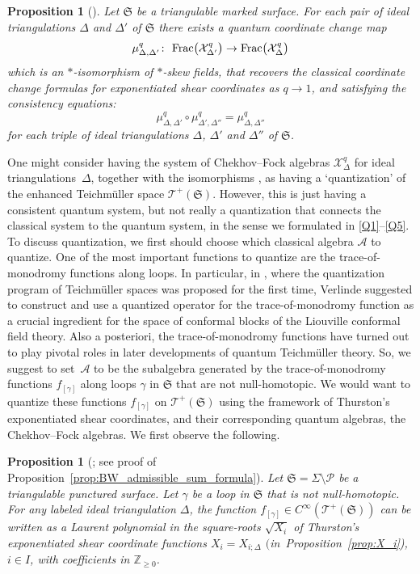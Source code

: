 \documentclass[10pt,a4paper]{amsart}
\numberwithin{equation}{section}
\newtheorem{Proposition}[Theorem]{Proposition}
\theoremstyle{definition}
\begin{document}
\begin{Proposition}[\cite{BL07, CF, FG09, Kash98, Liu}]
\label{prop:mu_q_Delta_Delta_prime}
Let $\mathfrak{S}$ be a triangulable marked surface.
For each pair of ideal triangulations $\Delta$ and $\Delta'$ of $\mathfrak{S}$ there exists a quantum coordinate change map
\[
\mu^q_{\Delta,\Delta'} \colon \ {\rm Frac}\bigl(\mathcal{X}^q_{\Delta'}\bigr) \to {\rm Frac}\bigl(\mathcal{X}^q_\Delta\bigr)
\]
which is an $*$-isomorphism of $*$-skew fields, that recovers the classical coordinate change formulas for exponentiated shear coordinates as $q\to 1$, and satisfying the consistency equations:
\[
\mu^q_{\Delta,\Delta'} \circ \mu^q_{\Delta',\Delta''} = \mu^q_{\Delta,\Delta''}
\]
for each triple of ideal triangulations $\Delta$, $\Delta'$ and $\Delta''$ of $\mathfrak{S}$.
\end{Proposition}
One might consider having the system of Chekhov--Fock algebras $\mathcal{X}^q_\Delta$ for ideal triangulations~$\Delta$, together with the isomorphisms , as having a `quantization' of the enhanced Teichm\"uller space $\mathscr{T}^+(\mathfrak{S})$. However, this is just having a consistent quantum system, but not really a quantization that connects the classical system to the quantum system, in the sense we formulated in \ref{Q1}--\ref{Q5}.
To discuss quantization, we first should choose which classical algebra $\mathcal{A}$ to quantize. One of the most important functions to quantize are the trace-of-monodromy functions along loops. In particular, in \cite{Verlinde}, where the quantization program of Teichm\"uller spaces was proposed for the first time, Verlinde suggested to construct and use a quantized operator for the trace-of-monodromy function as a crucial ingredient for the space of conformal blocks of the Liouville conformal field theory. Also a posteriori, the trace-of-monodromy functions have turned out to play pivotal roles in later developments of quantum Teichm\"uller theory. So, we suggest to set~$\mathcal{A}$ to be the subalgebra generated by the trace-of-monodromy functions $f_{[\gamma]}$ along loops $\gamma$ in $\mathfrak{S}$ that are not null-homotopic.
We would want to quantize these functions $f_{[\gamma]}$ on $\mathscr{T}^+(\mathfrak{S})$ using the framework of Thurston's exponentiated shear coordinates, and their corresponding quantum algebras, the Chekhov--Fock algebras. We first observe the following.
\begin{Proposition}[\cite{F93, F97, FG06, FG07}; see proof of Proposition~\ref{prop:BW_admissible_sum_formula}]
\label{prop:classical_Laurentness}
Let $\mathfrak{S} = \Sigma\setminus \mathcal{P}$ be a triangulable punctured surface. Let $\gamma$ be a loop in $\mathfrak{S}$ that is not null-homotopic. For any labeled ideal triangulation $\Delta$, the function $f_{[\gamma]} \in C^\infty(\mathscr{T}^+(\mathfrak{S}))$ can be written as a Laurent polynomial in the square-roots $\sqrt{X_i}$ of Thurston's exponentiated shear coordinate functions $X_i = X_{i;\Delta}$ $($in~Proposition~{\rm \ref{prop:X_i})}, $i\in I$, with coefficients in $\mathbb{Z}_{\ge 0}$.
\end{Proposition}
\end{document}
